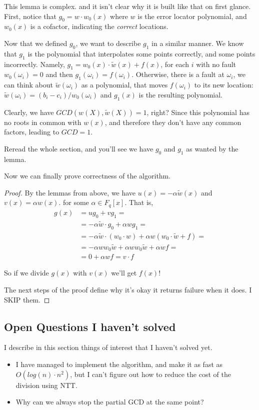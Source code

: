 This lemma is complex. and it isn't clear why it is built like that on first glance. 
First, notice that $g_0=w\cdot w_0(x)$ where $w$ is the error locator polynomial,
and $w_0(x)$ is a cofactor, indicating the \emph{correct} locations.

Now that we defined $g_0$, we want to describe $g_1$ 
in a similar manner. We know that $g_1$ is the polynomial that interpolates
some points correctly, and some points incorrectly.
Namely, $g_1=w_0(x)\cdot \tilde{w}(x)+f(x)$, for each $i$ with no fault $w_0(\omega_i)=0$
and then $g_1(\omega_i)=f(\omega_i)$. Otherwise, there is a fault at $\omega_i$, 
we can think about $\tilde{w}(\omega_i)$ as a polynomial,
that moves $f(\omega_i)$ to its new location:
$\tilde{w}(\omega_i)=(b_i-c_i)/w_0(\omega_i)$ and $g_1(x)$ is the resulting polynomial.

Clearly, we have $GCD(w(X),\tilde{w}(X))=1$, right? 
Since this polynomial has no roots in common with 
$w(x)$, and therefore they don't have any common
 factors, leading to $GCD=1$.

Reread the whole section, and you'll see we have $g_0$ and $g_1$ as wanted by the lemma.

Now we can finally prove correctness of the algorithm.
\begin{proof}
By the lemmas from above, we have 
$u(x)=-\alpha\tilde{w}(x)$ and $v(x)=\alpha w(x)$. for some $\alpha\in F_q[x]$.
That is, 
\begin{equation}
    \begin{split}
    g(x) & = u g_0+vg_1= \\
         & = -\alpha\tilde{w}\cdot g_0 + \alpha w g_1= \\
         & = -\alpha\tilde{w}\cdot (w_0 \cdot w) + \alpha w (w_0 \cdot \tilde{w}+f) = \\
         & = -\alpha w w_0 \tilde{w} + \alpha w w_0 \tilde{w} + \alpha w f = \\
         & = 0 + \alpha w f = v\cdot f
    \end{split}
\end{equation}

So if we divide $g(x)$ with $v(x)$ we'll get $f(x)$!

The next steps of the proof define why it's okay it returns failure when it does.
I SKIP them.
\end{proof}

\subsection{Open Questions I haven't solved}
I describe in this section things of interest that I haven't solved yet.
\begin{itemize}
    \item I have managed to implement the algorithm, and make it as fast as $O(log(n)\cdot n^2)$, 
    but I can't figure out how to reduce the cost of the division using NTT.

    \item Why can we always stop the partial GCD at the same point?
\end{itemize}
